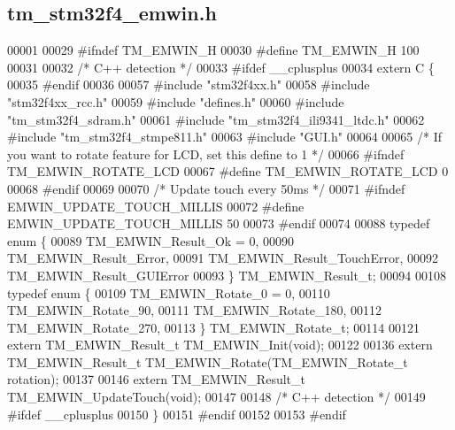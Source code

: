 \hypertarget{tm__stm32f4__emwin_8h_source}{}\subsection{tm\+\_\+stm32f4\+\_\+emwin.\+h}

\begin{DoxyCode}
00001 
00029 \textcolor{preprocessor}{#ifndef TM\_EMWIN\_H}
00030 \textcolor{preprocessor}{#define TM\_EMWIN\_H 100}
00031 
00032 \textcolor{comment}{/* C++ detection */}
00033 \textcolor{preprocessor}{#ifdef \_\_cplusplus}
00034 \textcolor{keyword}{extern} C \{
00035 \textcolor{preprocessor}{#endif}
00036 
00057 \textcolor{preprocessor}{#include "stm32f4xx.h"}
00058 \textcolor{preprocessor}{#include "stm32f4xx\_rcc.h"}
00059 \textcolor{preprocessor}{#include "defines.h"}
00060 \textcolor{preprocessor}{#include "tm\_stm32f4\_sdram.h"}
00061 \textcolor{preprocessor}{#include "tm\_stm32f4\_ili9341\_ltdc.h"}
00062 \textcolor{preprocessor}{#include "tm\_stm32f4\_stmpe811.h"}
00063 \textcolor{preprocessor}{#include "GUI.h"}
00064 
00065 \textcolor{comment}{/* If you want to rotate feature for LCD, set this define to 1 */}
00066 \textcolor{preprocessor}{#ifndef TM\_EMWIN\_ROTATE\_LCD}
00067 \textcolor{preprocessor}{#define TM\_EMWIN\_ROTATE\_LCD             0}
00068 \textcolor{preprocessor}{#endif}
00069 
00070 \textcolor{comment}{/* Update touch every 50ms */}
00071 \textcolor{preprocessor}{#ifndef EMWIN\_UPDATE\_TOUCH\_MILLIS}
00072 \textcolor{preprocessor}{#define EMWIN\_UPDATE\_TOUCH\_MILLIS       50}
00073 \textcolor{preprocessor}{#endif}
00074 
00088 \textcolor{keyword}{typedef} \textcolor{keyword}{enum} \{
00089     TM\_EMWIN\_Result\_Ok = 0,
00090     TM\_EMWIN\_Result\_Error,
00091     TM\_EMWIN\_Result\_TouchError,
00092     TM\_EMWIN\_Result\_GUIError
00093 \} TM\_EMWIN\_Result\_t;
00094 
00108 \textcolor{keyword}{typedef} \textcolor{keyword}{enum} \{
00109     TM\_EMWIN\_Rotate\_0 = 0,
00110     TM\_EMWIN\_Rotate\_90,
00111     TM\_EMWIN\_Rotate\_180,
00112     TM\_EMWIN\_Rotate\_270,
00113 \} TM\_EMWIN\_Rotate\_t;
00114 
00121 \textcolor{keyword}{extern} TM\_EMWIN\_Result\_t TM\_EMWIN\_Init(\textcolor{keywordtype}{void});
00122 
00136 \textcolor{keyword}{extern} TM\_EMWIN\_Result\_t TM\_EMWIN\_Rotate(TM\_EMWIN\_Rotate\_t rotation);
00137 
00146 \textcolor{keyword}{extern} TM\_EMWIN\_Result\_t TM\_EMWIN\_UpdateTouch(\textcolor{keywordtype}{void});
00147 
00148 \textcolor{comment}{/* C++ detection */}
00149 \textcolor{preprocessor}{#ifdef \_\_cplusplus}
00150 \}
00151 \textcolor{preprocessor}{#endif}
00152 
00153 \textcolor{preprocessor}{#endif}
\end{DoxyCode}
